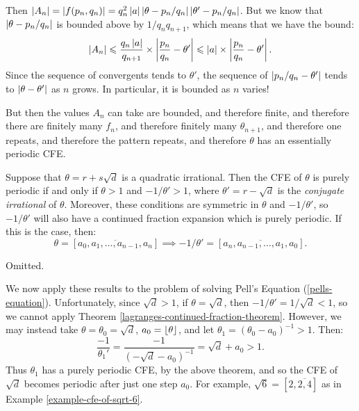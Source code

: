 \documentclass{article}
\begin{document}
\begin{prf}
	Then $\left\lvert A_n \right\rvert = \left\lvert f(p_n, q_n) \right\rvert = q_n^2 \left\lvert a \right\rvert \left\lvert \theta - p_n/q_n \right\rvert \left\lvert \theta' - p_n/q_n \right\rvert$. But we know that $\left\lvert \theta - p_n/q_n \right\rvert$ is bounded above by $1/q_n q_{n+1}$, which means that we have the bound:
	\[
	\left\lvert A_n \right\rvert \leqslant
	\frac{q_n \left\lvert a \right\rvert}{q_{n+1}} \times \left\lvert \frac{p_n}{q_n} - \theta' \right\rvert \leqslant
	\left\lvert a \right\rvert \times \left\lvert \frac{p_n}{q_n} - \theta' \right\rvert.
	\]
	Since the sequence of convergents tends to $\theta'$, the sequence of $\left\lvert p_n/q_n - \theta' \right\rvert$ tends to $\left\lvert \theta - \theta' \right\rvert$ as $n$ grows. In particular, it is bounded as $n$ varies!
	
	But then the values $A_n$ can take are bounded, and therefore finite, and therefore there are finitely many $f_n$, and therefore finitely many $\theta_{n+1}$, and therefore one repeats, and therefore the pattern repeats, and therefore $\theta$ has an essentially periodic CFE.
\end{prf}

\begin{theorem}
    Suppose that $\theta = r + s \sqrt d$ is a quadratic irrational. Then the CFE of $\theta$ is purely periodic if and only if $\theta > 1$ and $-1/\theta' > 1$, where $\theta' = r - \sqrt d$ is the \textit{conjugate irrational} of $\theta$. Moreover, these conditions are symmetric in $\theta$ and $-1/\theta'$, so $-1/\theta'$ will also have a continued fraction expansion which is purely periodic. If this is the case, then:
    \[
	\theta = [\overline{a_0, a_1, \dots, a_{n-1}, a_n}]
	\implies
	-1/\theta' = [\overline{a_n, a_{n-1}, \dots, a_1, a_0}].
	\]
\end{theorem}

\begin{prf}
    Omitted.
\end{prf}

We now apply these results to the problem of solving Pell's Equation (\ref{pells-equation}). Unfortunately, since $\sqrt d > 1$, if $\theta = \sqrt d$, then $-1/\theta' = 1/\sqrt{d} < 1$, so we cannot apply Theorem \ref{lagranges-continued-fraction-theorem}. However, we may instead take $\theta = \theta_0 = \sqrt d$, $a_0 = \left\lfloor\theta\right\rfloor$, and let $\theta_1 = (\theta_0 - a_0)^{-1} > 1$. Then:
\[
\frac{-1}{\theta_1'} = \frac{-1}{(- \sqrt{d} - a_0)^{-1}} =
\sqrt{d} + a_0 > 1.
\]
Thus $\theta_1$ has a purely periodic CFE, by the above theorem, and so the CFE of $\sqrt d$ becomes periodic after just one step $a_0$. For example, $\sqrt 6 = [2, \overline{2, 4}]$ as in Example \ref{example-cfe-of-sqrt-6}.
\end{document}
